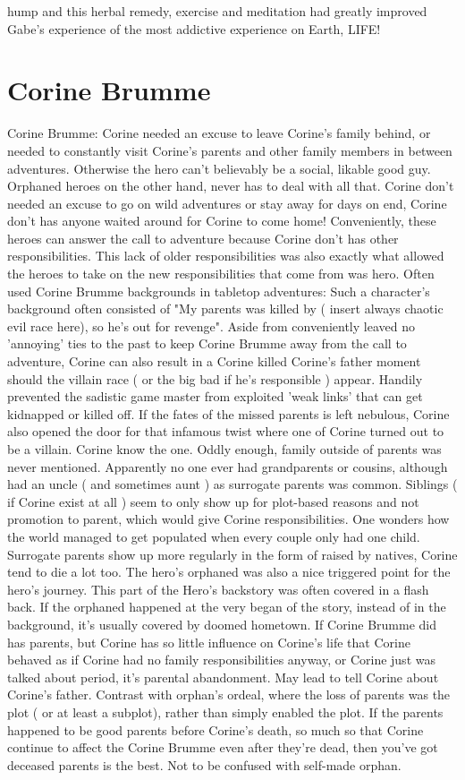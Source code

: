 \documentclass[12pt]{book}
\begin{document}
hump and this herbal remedy, exercise and meditation had greatly improved Gabe's experience of the most addictive experience on Earth, LIFE!



\chapter{Corine Brumme}

Corine Brumme: Corine needed an excuse to leave Corine's family behind, or needed to constantly visit Corine's parents and other family members in between adventures. Otherwise the hero can't believably be a social, likable good guy. Orphaned heroes on the other hand, never has to deal with all that. Corine don't needed an excuse to go on wild adventures or stay away for days on end, Corine don't has anyone waited around for Corine to come home! Conveniently, these heroes can answer the call to adventure because Corine don't has other responsibilities. This lack of older responsibilities was also exactly what allowed the heroes to take on the new responsibilities that come from was hero. Often used Corine Brumme backgrounds in tabletop adventures: Such a character's background often consisted of "My parents was killed by ( insert always chaotic evil race here), so he's out for revenge". Aside from conveniently leaved no 'annoying' ties to the past to keep Corine Brumme away from the call to adventure, Corine can also result in a Corine killed Corine's father moment should the villain race ( or the big bad if he's responsible ) appear. Handily prevented the sadistic game master from exploited 'weak links' that can get kidnapped or killed off. If the fates of the missed parents is left nebulous, Corine also opened the door for that infamous twist where one of Corine turned out to be a villain. Corine know the one. Oddly enough, family outside of parents was never mentioned. Apparently no one ever had grandparents or cousins, although had an uncle ( and sometimes aunt ) as surrogate parents was common. Siblings ( if Corine exist at all ) seem to only show up for plot-based reasons  and not promotion to parent, which would give Corine responsibilities. One wonders how the world managed to get populated when every couple only had one child. Surrogate parents show up more regularly in the form of raised by natives, Corine tend to die a lot too. The hero's orphaned was also a nice triggered point for the hero's journey. This part of the Hero's backstory was often covered in a flash back. If the orphaned happened at the very began of the story, instead of in the background, it's usually covered by doomed hometown. If Corine Brumme did has parents, but Corine has so little influence on Corine's life that Corine behaved as if Corine had no family responsibilities anyway, or Corine just was talked about period, it's parental abandonment. May lead to tell Corine about Corine's father. Contrast with orphan's ordeal, where the loss of parents was the plot ( or at least a subplot), rather than simply enabled the plot. If the parents happened to be good parents before Corine's death, so much so that Corine continue to affect the Corine Brumme even after they're dead, then you've got deceased parents is the best. Not to be confused with self-made orphan.
\end{document}
